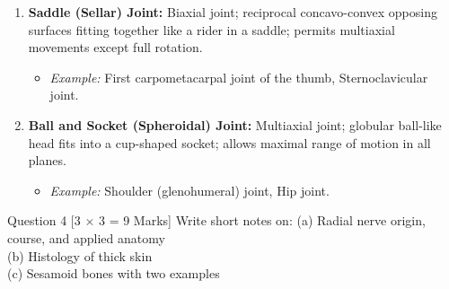 \documentclass[11pt,a4paper]{article}
\begin{document}
\begin{ansbox}
\begin{enumerate}[leftmargin=*]
\begin{itemize}
        \item \textit{Example:} Wrist (radiocarpal) joint, Metacarpophalangeal (MCP) joints.
    \end{itemize}
    \item \textbf{Saddle (Sellar) Joint:} Biaxial joint; reciprocal concavo-convex opposing surfaces fitting together like a rider in a saddle; permits multiaxial movements except full rotation.
    \begin{itemize}
        \item \textit{Example:} First carpometacarpal joint of the thumb, Sternoclavicular joint.
    \end{itemize}
    \item \textbf{Ball and Socket (Spheroidal) Joint:} Multiaxial joint; globular ball-like head fits into a cup-shaped socket; allows maximal range of motion in all planes.
    \begin{itemize}
        \item \textit{Example:} Shoulder (glenohumeral) joint, Hip joint.
    \end{itemize}
\end{enumerate}
\end{ansbox}

\begin{qbox}{Question 4 [3 $\times$ 3 = 9 Marks]}
Write short notes on:
(a) Radial nerve origin, course, and applied anatomy \\
(b) Histology of thick skin \\
(c) Sesamoid bones with two examples
\end{qbox}
\end{document}
